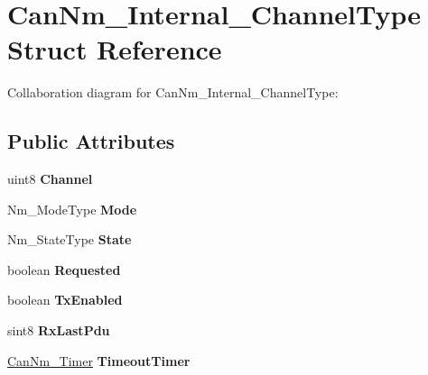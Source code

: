 \hypertarget{structCanNm__Internal__ChannelType}{}\section{Can\+Nm\+\_\+\+Internal\+\_\+\+Channel\+Type Struct Reference}
\label{structCanNm__Internal__ChannelType}


Collaboration diagram for Can\+Nm\+\_\+\+Internal\+\_\+\+Channel\+Type\+:
\subsection*{Public Attributes}
\begin{DoxyCompactItemize}
\item 
uint8 {\bfseries Channel}\hypertarget{structCanNm__Internal__ChannelType_a39a66f74fe4af8e88bcc2da21fc2797d}{}\label{structCanNm__Internal__ChannelType_a39a66f74fe4af8e88bcc2da21fc2797d}

\item 
Nm\+\_\+\+Mode\+Type {\bfseries Mode}\hypertarget{structCanNm__Internal__ChannelType_aac9e960d136e94f586ed265f1a24e87f}{}\label{structCanNm__Internal__ChannelType_aac9e960d136e94f586ed265f1a24e87f}

\item 
Nm\+\_\+\+State\+Type {\bfseries State}\hypertarget{structCanNm__Internal__ChannelType_a8de27fa2c5ea30dde5644f10806f00e4}{}\label{structCanNm__Internal__ChannelType_a8de27fa2c5ea30dde5644f10806f00e4}

\item 
boolean {\bfseries Requested}\hypertarget{structCanNm__Internal__ChannelType_a18e85ef680403c58af030f9bbd99dade}{}\label{structCanNm__Internal__ChannelType_a18e85ef680403c58af030f9bbd99dade}

\item 
boolean {\bfseries Tx\+Enabled}\hypertarget{structCanNm__Internal__ChannelType_ae55bf3b6994d5b8df6a6d828c79fbd67}{}\label{structCanNm__Internal__ChannelType_ae55bf3b6994d5b8df6a6d828c79fbd67}

\item 
sint8 {\bfseries Rx\+Last\+Pdu}\hypertarget{structCanNm__Internal__ChannelType_a8d4aafce6c1952fe842789e3622a0dae}{}\label{structCanNm__Internal__ChannelType_a8d4aafce6c1952fe842789e3622a0dae}

\item 
\hyperlink{structCanNm__Timer}{Can\+Nm\+\_\+\+Timer} {\bfseries Timeout\+Timer}\hypertarget{structCanNm__Internal__ChannelType_a88f155f226a7daadde35ffa3c7662938}{}\label{structCanNm__Internal__ChannelType_a88f155f226a7daadde35ffa3c7662938}


\end{DoxyCompactItemize}
